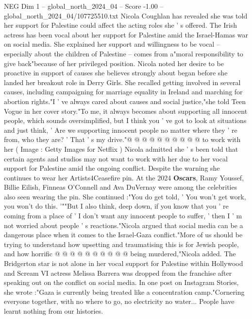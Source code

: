 \begin{textsample}{NEG Dim 1 – global\_north\_2024\_04 – Score -1.00 – global\_north\_2024\_04/107725510.txt}  \label{ex:f1_neg_298}
Nicola Coughlan has revealed she was told her support for Palestine could affect the acting roles she ' s offered.
The Irish actress has been vocal about her support for Palestine amid the Israel-Hamas war on social media.
She explained her support and willingness to be vocal -- especially about the children of Palestine -- comes from a"moral responsibility to give back"because of her privileged position.
Nicola noted her desire to be proactive in support of causes she believes strongly about began before she landed her breakout role in Derry Girls.
She recalled getting involved in several causes, including campaigning for marriage equality in Ireland and marching for abortion rights."I ' ve always cared about causes and social justice,"she told Teen Vogue in her cover story."To me, it always becomes about supporting all innocent people, which sounds oversimplified, but I think you ' ve got to look at situations and just think, ' Are we supporting innocent people no matter where they ' re from, who they are? ' That ' s my drive."@ @ @ @ @ @ @ @ @ @ to work with her ( Image : Getty Images for Netflix ) Nicola admitted she ' s been told that certain agents and studios may not want to work with her due to her vocal support for Palestine amid the ongoing conflict.
Despite the warning she continues to wear her Artists4Ceasefire pin.
At the 2024 \textbf{Oscars}, Ramy Youssef, Billie Eilish, Finneas O'Connell and Ava DuVernay were among the celebrities also seen wearing the pin.
She continued :"You do get told, ' You won't get work, you won't do this. '""But I also think, deep down, if you know that you ' re coming from a place of ' I don't want any innocent people to suffer, ' then I ' m not worried about people ' s reactions."Nicola argued that social media can be a dangerous place when it comes to the Israel-Gaza conflict."More of us should be trying to understand how upsetting and traumatising this is for Jewish people, and how horrific @ @ @ @ @ @ @ @ @ @ being murdered,"Nicola added.
The Bridgerton star is not alone in her vocal support for Palestine within Hollywood and Scream VI actress Melissa Barrera was dropped from the franchise after speaking out on the conflict on social media.
In one post on Instagram Stories, she wrote :"Gaza is currently being treated like a concentration camp."Cornering everyone together, with no where to go, no electricity no water...
People have learnt nothing from our histories.

\end{textsample}
